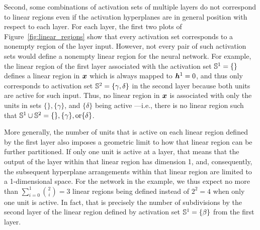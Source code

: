 Second, some combinations of activation sets of multiple layers do not correspond to linear regions even if the activation hyperplanes are in general position with respect to each layer. 
For each layer, the first two plots of Figure~\ref{fig:linear_regions} show that every activation set corresponds to a nonempty region of the layer input. 
However, not every pair of such activation sets would define a nonempty linear region for the neural network. 
For example, the linear region of the first layer associated with the activation set ${\mathbb{S}}^1 = \{\}$ defines a linear region in ${\bm{x}}$ which is always mapped to ${\bm{h}}^1=0$, 
and thus only corresponds to activation set ${\mathbb{S}}^2 = \{ \gamma, \delta \}$ in the second layer because both units are active for such input. 
Thus, no linear region in ${\bm{x}}$ is associated with only the units in sets $\{\}, \{\gamma\}$, and $\{ \delta \}$ being active ---i.e., there is no linear region such that ${\mathbb{S}}^1 \cup {\mathbb{S}}^2 = \{\}, \{\gamma\}, \text{or} \{\delta\}$.


More generally, the number of units that is active on each linear region defined by the first layer also imposes a geometric limit to how that linear region can be further partitioned. 
If only one unit is active at a layer, that means that the output of the layer within that linear region has dimension 1, 
and, consequently, the subsequent hyperplane arrangements within that linear region are limited to a 1-dimensional space.
For the network in the example, we thus expect no more than $\sum_{i=0}^1 \binom{2}{i} = 3$ linear regions being defined instead of $2^2 = 4$ when only one unit is active. 
In fact, 
that is precisely the number of subdivisions by the second layer of the linear region defined by activation set ${\mathbb{S}}^1 = \{\beta\}$ from the first layer. 
%


